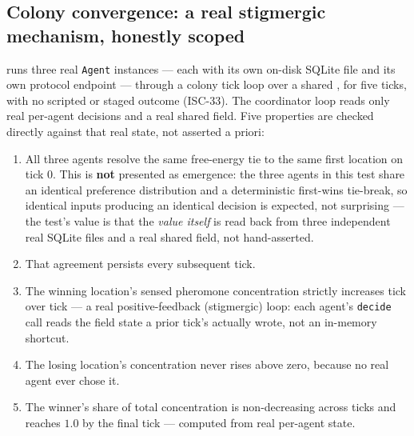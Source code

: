 \documentclass[
  english,
]{article}
\providecommand{\tightlist}{%
  \setlength{\itemsep}{0pt}\setlength{\parskip}{0pt}}
\theoremstyle{definition}
\begin{document}
\subsection{Colony convergence: a real stigmergic mechanism, honestly
scoped}\label{colony-convergence-a-real-stigmergic-mechanism-honestly-scoped}

 runs three real
\texttt{Agent} instances --- each with its own on-disk SQLite file and
its own protocol endpoint --- through a colony tick loop over a shared
, for five ticks, with no scripted or
staged outcome (ISC-33). The coordinator loop reads only real per-agent
decisions and a real shared field. Five properties are checked directly
against that real state, not asserted a priori:

\begin{enumerate}
\def\labelenumi{\arabic{enumi}.}
\tightlist
\item
  All three agents resolve the same free-energy tie to the same first
  location on tick 0. This is \textbf{not} presented as emergence: the
  three agents in this test share an identical preference distribution
  and a deterministic first-wins tie-break, so identical inputs
  producing an identical decision is expected, not surprising --- the
  test's value is that the \emph{value itself} is read back from three
  independent real SQLite files and a real shared field, not
  hand-asserted.
\item
  That agreement persists every subsequent tick.
\item
  The winning location's sensed pheromone concentration strictly
  increases tick over tick --- a real positive-feedback (stigmergic)
  loop: each agent's \texttt{decide} call reads the field state a prior
  tick's  actually wrote, not an in-memory
  shortcut.
\item
  The losing location's concentration never rises above zero, because no
  real agent ever chose it.
\item
  The winner's share of total concentration is non-decreasing across
  ticks and reaches \(1.0\) by the final tick --- computed from real
  per-agent state.
\end{enumerate}
\end{document}
